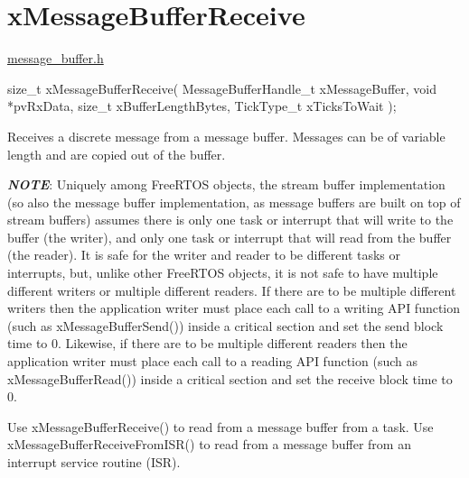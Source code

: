 \hypertarget{group__x_message_buffer_receive}{}\section{x\+Message\+Buffer\+Receive}
\label{group__x_message_buffer_receive}
\mbox{\hyperlink{message__buffer_8h_source}{message\+\_\+buffer.\+h}}


\begin{DoxyPre}
size\_t xMessageBufferReceive( MessageBufferHandle\_t xMessageBuffer,
                              void *pvRxData,
                              size\_t xBufferLengthBytes,
                              TickType\_t xTicksToWait );
\end{DoxyPre}


Receives a discrete message from a message buffer. Messages can be of variable length and are copied out of the buffer.

{\itshape {\bfseries{N\+O\+TE}}}\+: Uniquely among Free\+R\+T\+OS objects, the stream buffer implementation (so also the message buffer implementation, as message buffers are built on top of stream buffers) assumes there is only one task or interrupt that will write to the buffer (the writer), and only one task or interrupt that will read from the buffer (the reader). It is safe for the writer and reader to be different tasks or interrupts, but, unlike other Free\+R\+T\+OS objects, it is not safe to have multiple different writers or multiple different readers. If there are to be multiple different writers then the application writer must place each call to a writing A\+PI function (such as x\+Message\+Buffer\+Send()) inside a critical section and set the send block time to 0. Likewise, if there are to be multiple different readers then the application writer must place each call to a reading A\+PI function (such as x\+Message\+Buffer\+Read()) inside a critical section and set the receive block time to 0.

Use x\+Message\+Buffer\+Receive() to read from a message buffer from a task. Use x\+Message\+Buffer\+Receive\+From\+I\+S\+R() to read from a message buffer from an interrupt service routine (I\+SR).


